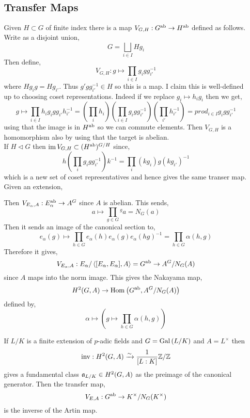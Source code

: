 \documentclass[12pt]{article}
\begin{document}
\subsection{Transfer Maps}

Given $H \subset G$ of finite index there is a map $V_{G, H} : G^{\mathrm{ab}} \to H^{\mathrm{ab}}$ defined as follows. Write as a disjoint union,
\[ G = \bigsqcup_{ i \in I} H g_i \]
Then define,
\[ V_{G, H} : g \mapsto \prod_{i \in I} g_i g g_{i'}^{-1} \]
where $H g_i g = H g_{i'}$. Thus $g' g g_{i'}^{-1} \in H$ so this is a map. I claim this is well-defined up to choosing coset representations. Indeed if we replace $g_i \mapsto h_i g_i$ then we get,
\[ g \mapsto \prod_{i \in I} h_i g_i g g_{i'} h_{i'}^{-1} = \left( \prod_{i} h_i \right) \left( \prod_{i \in I} g_i g g_{i'}^{-1} \right) \left( \prod_{i'} h_{i'}^{-1} \right) = prod_{i \in I} g_i g g_{i'}^{-1} \]
using that the image is in $H^{\mathrm{ab}}$ so we can commute elements. Then $V_{G,H}$ is a homomorphism also by using that the target is abelian. 
\bigskip\\
If $H \triangleleft G$ then $\operatorname{\mathrm{im}}{V_{G,H}} \subset (H^{\mathrm{ab}})^{G/H}$ since,
\[ h \left( \prod_i g_i g g_{i'}^{-1} \right) k^{-1} = \prod_i (k g_i) g (k g_{i'})^{-1} \]
which is a new set of coset representatives and hence gives the same transer map.
\bigskip\\
Given an extension,
\begin{center}
\end{center}
Then $V_{E_{\alpha}, A} : E_{\alpha}^{\mathrm{ab}} \to A^G$ since $A$ is abelian. This sends,
\[ a \mapsto \prod_{g \in G} {}^g a = N_G(a) \]
Then it sends an image of the canonical section to,
\[ e_\alpha(g) \mapsto \prod_{h \in G} e_\alpha(h) e_\alpha(g) e_{\alpha}(hg)^{-1} = \prod_{h \in G} \alpha(h, g) \]
Therefore it gives,
\[ V_{E_{\alpha}, A} :  E_{\alpha} / \left< [E_\alpha, E_\alpha], A \right> = G^{\mathrm{ab}} \to A^G / N_G(A) \]
since $A$ maps into the norm image. This gives the Nakayama map,
\[ H^2(G, A) \to \mathrm{Hom}_{} \left( G^{\mathrm{ab}}, A^G / N_G(A) \right) \]
defined by,
\[ \alpha \mapsto \left( g \mapsto \prod_{h \in G} \alpha(h, g) \right) \]

\newcommand{\inv}{\mathrm{inv}}

\begin{example}
If $L/K$ is a finite extension of $p$-adic fields and $G = \mathrm{Gal}\left( L/K \right)$ and $A = L^\times$ then 
\[ \inv : H^2(G, A) \iso \frac{1}{[L : K]} \Z / \Z \]
gives a fundamental class $\mathfrak{a}_{L/K} \in H^2(G, A)$ as the preimage of the canonical generator. Then the transfer map,
\[ V_{E,A} : G^{\mathrm{ab}} \to K^\times / N_G(K^\times) \]
is the inverse of the Artin map. 
\end{example}
\end{document}
